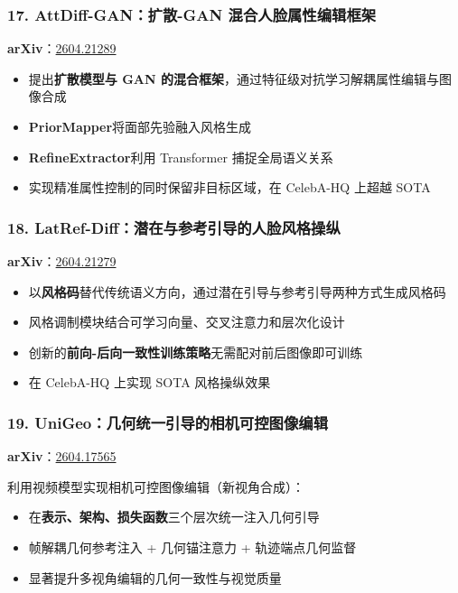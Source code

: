\subsubsection{17. AttDiff-GAN：扩散-GAN 混合人脸属性编辑框架}

\textbf{arXiv}：\href{https://arxiv.org/abs/2604.21289}{2604.21289}

\begin{itemize}[leftmargin=1.5em]
  \item 提出\textbf{扩散模型与 GAN 的混合框架}，通过特征级对抗学习解耦属性编辑与图像合成
  \item \textbf{PriorMapper}将面部先验融入风格生成
  \item \textbf{RefineExtractor}利用 Transformer 捕捉全局语义关系
  \item 实现精准属性控制的同时保留非目标区域，在 CelebA-HQ 上超越 SOTA
\end{itemize}

\subsubsection{18. LatRef-Diff：潜在与参考引导的人脸风格操纵}

\textbf{arXiv}：\href{https://arxiv.org/abs/2604.21279}{2604.21279}

\begin{itemize}[leftmargin=1.5em]
  \item 以\textbf{风格码}替代传统语义方向，通过潜在引导与参考引导两种方式生成风格码
  \item 风格调制模块结合可学习向量、交叉注意力和层次化设计
  \item 创新的\textbf{前向-后向一致性训练策略}无需配对前后图像即可训练
  \item 在 CelebA-HQ 上实现 SOTA 风格操纵效果
\end{itemize}

\subsubsection{19. UniGeo：几何统一引导的相机可控图像编辑}

\textbf{arXiv}：\href{https://arxiv.org/abs/2604.17565}{2604.17565}

利用视频模型实现相机可控图像编辑（新视角合成）：

\begin{itemize}[leftmargin=1.5em]
  \item 在\textbf{表示、架构、损失函数}三个层次统一注入几何引导
  \item 帧解耦几何参考注入 + 几何锚注意力 + 轨迹端点几何监督
  \item 显著提升多视角编辑的几何一致性与视觉质量
\end{itemize}

